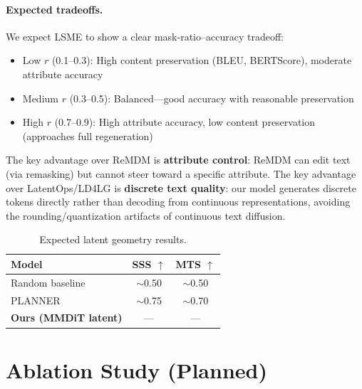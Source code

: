 \documentclass{article}
\begin{document}
\paragraph{Expected tradeoffs.} We expect LSME to show a clear mask-ratio--accuracy tradeoff:
\begin{itemize}
    \item Low $r$ (0.1--0.3): High content preservation (BLEU, BERTScore), moderate attribute accuracy
    \item Medium $r$ (0.3--0.5): Balanced---good accuracy with reasonable preservation
    \item High $r$ (0.7--0.9): High attribute accuracy, low content preservation (approaches full regeneration)
\end{itemize}

The key advantage over ReMDM is \textbf{attribute control}: ReMDM can edit text (via remasking) but cannot steer toward a specific attribute.
The key advantage over LatentOps/LD4LG is \textbf{discrete text quality}: our model generates discrete tokens directly rather than decoding from continuous representations, avoiding the rounding/quantization artifacts of continuous text diffusion.

\begin{table}[h]
\centering
\caption{Expected latent geometry results.}
\begin{tabular}{lcc}
\toprule
\textbf{Model} & \textbf{SSS} $\uparrow$ & \textbf{MTS} $\uparrow$ \\
\midrule
Random baseline & $\sim$0.50 & $\sim$0.50 \\
PLANNER & $\sim$0.75 & $\sim$0.70 \\
\textbf{Ours (MMDiT latent)} & --- & --- \\
\bottomrule
\end{tabular}
\end{table}

\section{Ablation Study (Planned)}
\end{document}
